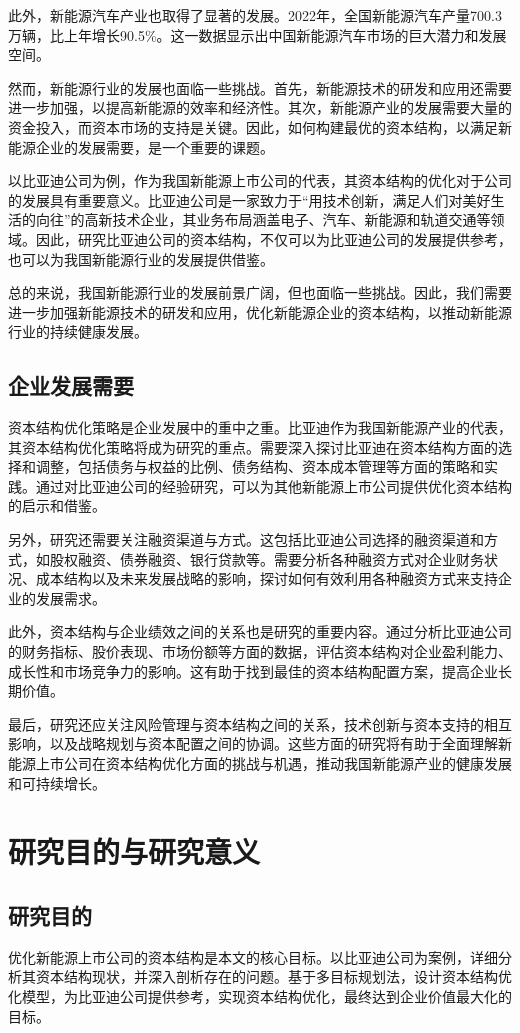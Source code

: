 此外，新能源汽车产业也取得了显著的发展。2022年，全国新能源汽车产量700.3万辆，比上年增长90.5\%。这一数据显示出中国新能源汽车市场的巨大潜力和发展空间。

然而，新能源行业的发展也面临一些挑战。首先，新能源技术的研发和应用还需要进一步加强，以提高新能源的效率和经济性。其次，新能源产业的发展需要大量的资金投入，而资本市场的支持是关键。因此，如何构建最优的资本结构，以满足新能源企业的发展需要，是一个重要的课题。

以比亚迪公司为例，作为我国新能源上市公司的代表，其资本结构的优化对于公司的发展具有重要意义。比亚迪公司是一家致力于“用技术创新，满足人们对美好生活的向往”的高新技术企业，其业务布局涵盖电子、汽车、新能源和轨道交通等领域。因此，研究比亚迪公司的资本结构，不仅可以为比亚迪公司的发展提供参考，也可以为我国新能源行业的发展提供借鉴。

总的来说，我国新能源行业的发展前景广阔，但也面临一些挑战。因此，我们需要进一步加强新能源技术的研发和应用，优化新能源企业的资本结构，以推动新能源行业的持续健康发展。

\subsection{企业发展需要}
资本结构优化策略是企业发展中的重中之重。比亚迪作为我国新能源产业的代表，其资本结构优化策略将成为研究的重点。需要深入探讨比亚迪在资本结构方面的选择和调整，包括债务与权益的比例、债务结构、资本成本管理等方面的策略和实践。通过对比亚迪公司的经验研究，可以为其他新能源上市公司提供优化资本结构的启示和借鉴。

另外，研究还需要关注融资渠道与方式。这包括比亚迪公司选择的融资渠道和方式，如股权融资、债券融资、银行贷款等。需要分析各种融资方式对企业财务状况、成本结构以及未来发展战略的影响，探讨如何有效利用各种融资方式来支持企业的发展需求。

此外，资本结构与企业绩效之间的关系也是研究的重要内容。通过分析比亚迪公司的财务指标、股价表现、市场份额等方面的数据，评估资本结构对企业盈利能力、成长性和市场竞争力的影响。这有助于找到最佳的资本结构配置方案，提高企业长期价值。

最后，研究还应关注风险管理与资本结构之间的关系，技术创新与资本支持的相互影响，以及战略规划与资本配置之间的协调。这些方面的研究将有助于全面理解新能源上市公司在资本结构优化方面的挑战与机遇，推动我国新能源产业的健康发展和可持续增长。
\section{研究目的与研究意义}
\subsection{研究目的}
优化新能源上市公司的资本结构是本文的核心目标。以比亚迪公司为案例，详细分析其资本结构现状，并深入剖析存在的问题。基于多目标规划法，设计资本结构优化模型，为比亚迪公司提供参考，实现资本结构优化，最终达到企业价值最大化的目标。


